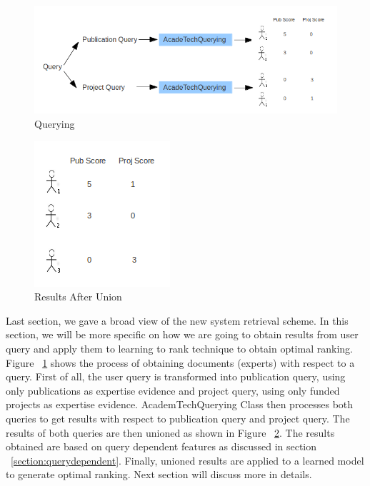 \begin{figure}
\centering
\includegraphics[scale=0.7]{./figures/querying.png}
\caption{Querying} \label{fig:quering} 
\end{figure}
\quad
\begin{figure}
\centering
\includegraphics[scale=0.7]{./figures/union.png}
\caption{Results After Union} \label{fig:union} 
\end{figure}
Last section, we gave a broad view of the new system retrieval scheme. In this section, we will be more specific on how we are going to 
obtain results from user query and apply them to learning to rank technique to obtain optimal ranking.
Figure ~\ref{fig:quering} shows the process of obtaining documents (experts) with respect to a query. 
First of all, the user query is transformed into publication query, using only publications as expertise evidence and project
query, using only funded projects as expertise evidence. 
AcademTechQuerying Class then processes both queries to get results with respect to publication query and project query. The results of both
queries are then unioned as shown in Figure ~\ref{fig:union}. The results obtained are based on query dependent features as discussed in section 
~\ref{section:querydependent}. Finally, unioned results are applied to a learned model to generate optimal ranking. Next section will discuss more in
details.

